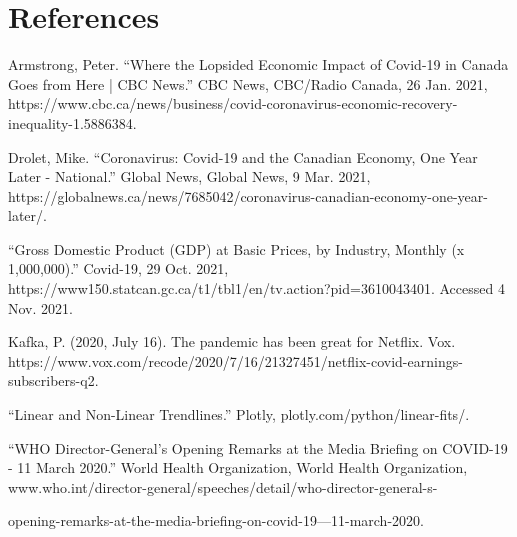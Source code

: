\documentclass[fontsize=11pt]{article}
\begin{document}
\newpage

\section*{References}


Armstrong, Peter. “Where the Lopsided Economic Impact of Covid-19 in Canada Goes from Here | CBC News.” CBC News, CBC/Radio Canada, 26 Jan. 2021, https://www.cbc.ca/news/business/covid-coronavirus-economic-recovery-inequality-1.5886384. 

\medskip

Drolet, Mike. “Coronavirus: Covid-19 and the Canadian Economy, One Year Later - National.” Global News, Global News, 9 Mar. 2021, https://globalnews.ca/news/7685042/coronavirus-canadian-economy-one-year-later/.  

\medskip

 “Gross Domestic Product (GDP) at Basic Prices, by Industry, Monthly (x 1,000,000).” Covid-19, 29 Oct. 2021, https://www150.statcan.gc.ca/t1/tbl1/en/tv.action?pid=3610043401. Accessed 4 Nov. 2021.

\medskip

Kafka, P. (2020, July 16). The pandemic has been great for Netflix. Vox.  https://www.vox.com/recode/2020/7/16/21327451/netflix-covid-earnings-subscribers-q2. 

\medskip

“Linear and Non-Linear Trendlines.” Plotly, plotly.com/python/linear-fits/.

\medskip

“WHO Director-General's Opening Remarks at the Media Briefing on COVID-19 - 11 March 2020.” World Health Organization, World Health Organization, www.who.int/director-general/speeches/detail/who-director-general-s-

opening-remarks-at-the-media-briefing-on-covid-19---11-march-2020. 
\end{document}

